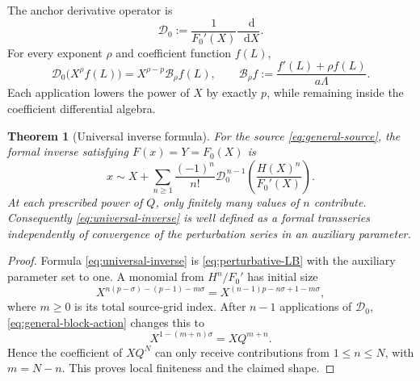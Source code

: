 \documentclass[11pt,oneside]{article}
\theoremstyle{plain}
\newtheorem{theorem}{Theorem}[section]
\theoremstyle{definition}
\theoremstyle{remark}
\newcommand{\dd}{\mathop{}\!\mathrm{d}}
\newcommand{\Bcal}{\mathcal{B}}
\begin{document}
The anchor derivative operator is
\begin{equation}
 \mathscr D_0
 :=\frac1{F_0'(X)}\frac{\dd}{\dd X}.
 \label{eq:general-D0}
\end{equation}
For every exponent \(\rho\) and coefficient function \(f(L)\),
\begin{equation}
 \mathscr D_0\bigl(X^\rho f(L)\bigr)
 =X^{\rho-p}\Bcal_\rho f(L),
 \qquad
 \Bcal_\rho f:=\frac{f'(L)+\rho f(L)}{a\Lambda}.
 \label{eq:general-block-action}
\end{equation}
Each application lowers the power of \(X\) by exactly \(p\), while remaining
inside the coefficient differential algebra.

\begin{theorem}[Universal inverse formula]
\label{thm:universal-inverse}
For the source \cref{eq:general-source}, the formal inverse satisfying
\(F(x)=Y=F_0(X)\) is
\begin{equation}
 \boxed{
 x
 \sim X+\sum_{n\ge1}\frac{(-1)^n}{n!}
 \mathscr D_0^{\,n-1}
 \left(\frac{H(X)^n}{F_0'(X)}\right).}
 \label{eq:universal-inverse}
\end{equation}
At each prescribed power of \(Q\), only finitely many values of \(n\)
contribute.  Consequently \cref{eq:universal-inverse} is well defined as a
formal transseries independently of convergence of the perturbation series in
an auxiliary parameter.
\end{theorem}

\begin{proof}
Formula \cref{eq:universal-inverse} is
\cref{eq:perturbative-LB} with the auxiliary parameter set to one.  A monomial
from \(H^n/F_0'\) has initial size
\begin{equation}
 X^{n(p-\sigma)-(p-1)-m\sigma}
 =X^{(n-1)p-n\sigma+1-m\sigma},
 \end{equation}
where \(m\ge0\) is its total source-grid index.  After \(n-1\) applications
of \(\mathscr D_0\), \cref{eq:general-block-action} changes this to
\begin{equation}
 X^{1-(m+n)\sigma}=XQ^{m+n}.
 \label{eq:local-finiteness-power}
\end{equation}
Hence the coefficient of \(XQ^N\) can only receive contributions from
\(1\le n\le N\), with \(m=N-n\).  This proves local finiteness and the claimed
shape.
\end{proof}
\end{document}
